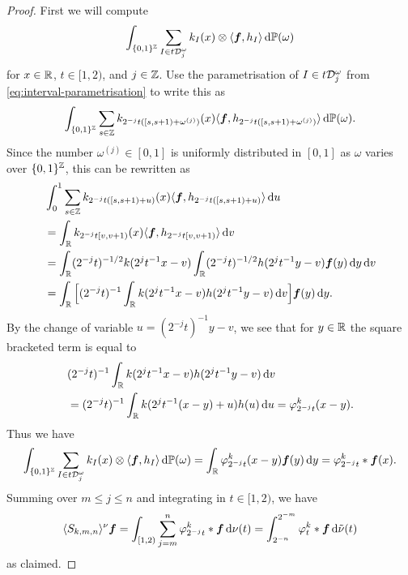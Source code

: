 \begin{proof}
  First we will compute
  \begin{equation*}
    \int_{\{0,1\}^{\mathbb{Z}}} \sum_{I \in t\mathcal{D}_{j}^{\omega}} k_{I}(x) \otimes \langle \bm{f}, h_{I} \rangle \, \mathrm{d}\mathbb{P}(\omega)
  \end{equation*}
  for $x \in \mathbb{R}$, $t \in [1,2)$, and $j \in \mathbb{Z}$.
  Use the parametrisation of $I \in t\mathcal{D}_{j}^{\omega}$ from \eqref{eq:interval-parametrisation} to write this as
  \begin{equation*}
    \int_{\{0,1\}^{\mathbb{Z}}} \sum_{s \in \mathbb{Z}} k_{2^{-j}t([s,s+1) + \omega^{(j)})}(x) \langle \bm{f}, h_{2^{-j}t([s,s+1) + \omega^{(j)})} \rangle \, \mathrm{d}\mathbb{P}(\omega).
  \end{equation*}
  Since the number $\omega^{(j)} \in [0,1]$ is uniformly distributed in $[0,1]$ as $\omega$ varies over $\{0,1\}^{\mathbb{Z}}$, this can be rewritten as
  \begin{equation*}
    \begin{aligned}
    &\int_{0}^{1} \sum_{s \in \mathbb{Z}} k_{2^{-j}t([s,s+1) + u)}(x) \langle \bm{f}, h_{2^{-j}t([s,s+1) + u)} \rangle \, \mathrm{d} u \\
    &= \int_{\mathbb{R}}  k_{2^{-j}t[v,v+1)}(x) \langle \bm{f}, h_{2^{-j}t[v,v+1)} \rangle \, \mathrm{d} v \\
    &= \int_{\mathbb{R}} (2^{-j} t)^{-1/2} k(2^{j} t^{-1} x - v)\int_{\mathbb{R}} (2^{-j} t)^{-1/2} h(2^{j} t^{-1} y - v)\bm{f}(y) \, \mathrm{d} y \, \mathrm{d} v \\
    &= \int_{\mathbb{R}} \Big[ (2^{-j} t)^{-1} \int_{\mathbb{R}} k(2^j t^{-1} x - v) h(2^j t^{-1} y - v) \, \mathrm{d} v \Big] \bm{f}(y) \, \mathrm{d} y .
  \end{aligned}
\end{equation*}
By the change of variable $u = (2^{-j}t)^{-1} y - v$, we see that for $y \in \mathbb{R}$ the square bracketed term is equal to
\begin{equation*}
  \begin{aligned}
    &(2^{-j} t)^{-1} \int_{\mathbb{R}} k(2^j t^{-1} x - v) h(2^j t^{-1} y - v) \, \mathrm{d} v \\
    &= (2^{-j} t)^{-1} \int_{\mathbb{R}} k(2^j t^{-1} (x-y) + u) h(u) \, \mathrm{d} u
    = \varphi_{2^{-j} t}^{k}(x-y).
  \end{aligned}
\end{equation*}
Thus we have
\begin{equation*}
  \int_{\{0,1\}^{\mathbb{Z}}} \sum_{I \in t\mathcal{D}_{j}^{\omega}} k_{I}(x) \otimes \langle \bm{f}, h_{I} \rangle \, \mathrm{d}\mathbb{P}(\omega)
  = \int_{\mathbb{R}} \varphi_{2^{-j} t}^{k}(x-y) \bm{f}(y) \, \mathrm{d} y
  = \varphi_{2^{-j} t}^{k} \ast \bm{f}(x).
\end{equation*}
Summing over $m \leq j \leq n$ and integrating in $t \in [1,2)$, we have
\begin{equation*}
  \langle S_{k,m,n} \rangle^{\nu} \bm{f} = \int_{[1,2)} \sum_{j=m}^{n} \varphi_{2^{-j} t}^{k} \ast \bm{f}   \, \mathrm{d}\nu(t) = \int_{2^{-n}}^{2^{-m}} \varphi^{k}_{t} \ast \bm{f} \, \mathrm{d}\tilde{\nu}(t)
\end{equation*}
as claimed.
\end{proof}

